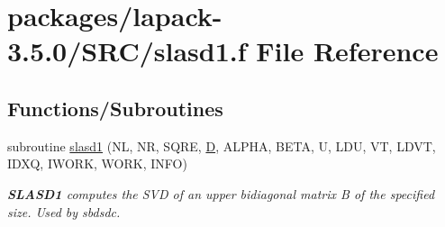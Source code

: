 \hypertarget{slasd1_8f}{}\section{packages/lapack-\/3.5.0/\+S\+R\+C/slasd1.f File Reference}
\label{slasd1_8f}
\subsection*{Functions/\+Subroutines}
\begin{DoxyCompactItemize}
\item 
subroutine \hyperlink{group__auxOTHERauxiliary_ga882db55a5643e6b13ebbf68635f3946c}{slasd1} (N\+L, N\+R, S\+Q\+R\+E, \hyperlink{odrpack_8h_a7dae6ea403d00f3687f24a874e67d139}{D}, A\+L\+P\+H\+A, B\+E\+T\+A, U, L\+D\+U, V\+T, L\+D\+V\+T, I\+D\+X\+Q, I\+W\+O\+R\+K, W\+O\+R\+K, I\+N\+F\+O)
\begin{DoxyCompactList}\small\item\em {\bfseries S\+L\+A\+S\+D1} computes the S\+V\+D of an upper bidiagonal matrix B of the specified size. Used by sbdsdc. \end{DoxyCompactList}\end{DoxyCompactItemize}
